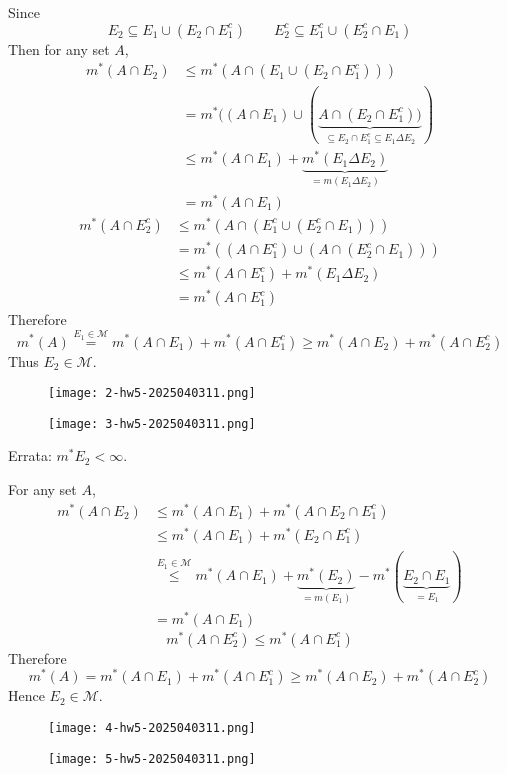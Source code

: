 Since
\[
E_2\subseteq E_1\cup(E_2\cap E_1^{c})\qquad E_2^{c}\subseteq E_1^{c}\cup(E_2^{c}\cap E_1)
\]
Then for any set $A$,
\[
\begin{aligned}
m^{*}(A\cap E_2) & \leq m^{*}(A\cap(E_1\cup(E_2\cap E_1^{c}))) \\
 & =m^{*}((A\cap E_1)\cup(\underbrace{ A\cap(E_2\cap E_1^{c})) }_{ \subseteq E_2\cap E_1^{c}\subseteq E_1\Delta E_2 }) \\
 & \leq m^{*}(A\cap E_1)+\underbrace{ m^{*}(E_1\Delta E_2) }_{ =m(E_1\Delta E_2) } \\
 & =m^{*}(A\cap E_1)
\end{aligned}
\]
\[
\begin{aligned}
m^{*}(A\cap E_2^{c}) & \leq m^{*}(A\cap(E_1^{c}\cup(E_2^{c}\cap E_1))) \\
 & =m^{*}((A\cap E_1^{c})\cup(A\cap(E_2^{c}\cap E_1))) \\
 & \leq m^{*}(A\cap E_1^{c})+m^{*}(E_1\Delta E_2) \\
 & = m^{*}(A\cap E_1^{c})
\end{aligned}
\]
Therefore
\[
m^{*}(A)\overset{ E_1\in \mathcal{M} }{ = }m^{*}(A\cap E_1)+m^{*}(A\cap E_1^{c})\geq m^{*}(A\cap E_2)+m^{*}(A\cap E_2^{c})
\]
Thus $E_2\in \mathcal{M}$.

\begin{figure}[H]
\centering
\texttt{[image: 2-hw5-2025040311.png]}
\label{}
\end{figure}
\begin{figure}[H]
\centering
\texttt{[image: 3-hw5-2025040311.png]}
\label{}
\end{figure}

Errata: $m^{*}E_2<\infty$.

For any set $A$,
\[
\begin{aligned}
m^{*}(A\cap E_2) & \leq  m^{*}(A\cap E_1)+m^{*}(A\cap E_2\cap E_1^{c}) \\
 & \leq m^{*}(A\cap E_1)+m^{*}(E_2\cap E_1^{c}) \\
 & \overset{ E_1\in \mathcal{M} }{ \leq  } m^{*}(A\cap E_1)+\underbrace{ m^{*}(E_2) }_{ =m(E_1) }-m^{*}(\underbrace{ E_2\cap E_1 }_{ =E_1 }) \\
 & =m^{*}(A\cap E_1)
\end{aligned}
\]
\[
m^{*}(A\cap E_2^{c})\leq m^{*}(A\cap E_1^{c})
\]
Therefore
\[
m^{*}(A)=m^{*}(A\cap E_1)+m^{*}(A\cap E_1^{c})\geq m^{*}(A\cap E_2)+m^{*}(A\cap E_2^{c})
\]
Hence $E_2\in \mathcal{M}$.

\begin{figure}[H]
\centering
\texttt{[image: 4-hw5-2025040311.png]}
\label{}
\end{figure}
\begin{figure}[H]
\centering
\texttt{[image: 5-hw5-2025040311.png]}
\label{}
\end{figure}

